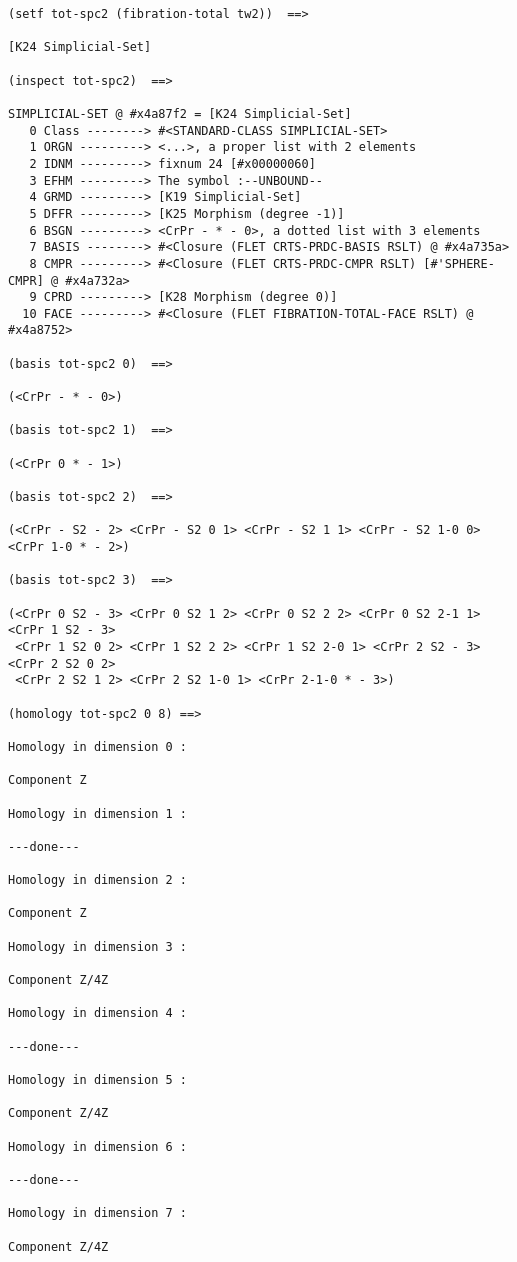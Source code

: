 {\footnotesize\begin{verbatim}
(setf tot-spc2 (fibration-total tw2))  ==>

[K24 Simplicial-Set]

(inspect tot-spc2)  ==>

SIMPLICIAL-SET @ #x4a87f2 = [K24 Simplicial-Set]
   0 Class --------> #<STANDARD-CLASS SIMPLICIAL-SET>
   1 ORGN ---------> <...>, a proper list with 2 elements
   2 IDNM ---------> fixnum 24 [#x00000060]
   3 EFHM ---------> The symbol :--UNBOUND--
   4 GRMD ---------> [K19 Simplicial-Set]
   5 DFFR ---------> [K25 Morphism (degree -1)]
   6 BSGN ---------> <CrPr - * - 0>, a dotted list with 3 elements
   7 BASIS --------> #<Closure (FLET CRTS-PRDC-BASIS RSLT) @ #x4a735a>
   8 CMPR ---------> #<Closure (FLET CRTS-PRDC-CMPR RSLT) [#'SPHERE-CMPR] @ #x4a732a>
   9 CPRD ---------> [K28 Morphism (degree 0)]
  10 FACE ---------> #<Closure (FLET FIBRATION-TOTAL-FACE RSLT) @ #x4a8752>

(basis tot-spc2 0)  ==>

(<CrPr - * - 0>)

(basis tot-spc2 1)  ==>

(<CrPr 0 * - 1>)

(basis tot-spc2 2)  ==>

(<CrPr - S2 - 2> <CrPr - S2 0 1> <CrPr - S2 1 1> <CrPr - S2 1-0 0> <CrPr 1-0 * - 2>)

(basis tot-spc2 3)  ==>

(<CrPr 0 S2 - 3> <CrPr 0 S2 1 2> <CrPr 0 S2 2 2> <CrPr 0 S2 2-1 1> <CrPr 1 S2 - 3> 
 <CrPr 1 S2 0 2> <CrPr 1 S2 2 2> <CrPr 1 S2 2-0 1> <CrPr 2 S2 - 3> <CrPr 2 S2 0 2> 
 <CrPr 2 S2 1 2> <CrPr 2 S2 1-0 1> <CrPr 2-1-0 * - 3>)

(homology tot-spc2 0 8) ==>

Homology in dimension 0 :

Component Z

Homology in dimension 1 :

---done---

Homology in dimension 2 :

Component Z

Homology in dimension 3 :

Component Z/4Z

Homology in dimension 4 :

---done---

Homology in dimension 5 :

Component Z/4Z

Homology in dimension 6 :

---done---

Homology in dimension 7 :

Component Z/4Z
\end{verbatim}}
